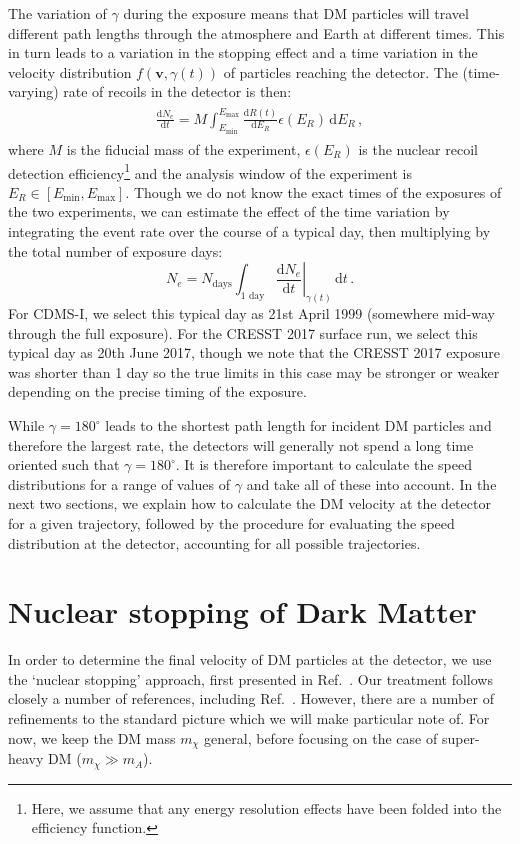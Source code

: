\documentclass[prd,twocolumn,showpacs,nofootinbib,aps]{revtex4-1}
\newcommand{\dbd}[2]{\frac{\mathrm{d}#1}{\mathrm{d}#2}}
\begin{document}
The variation of $\gamma$ during the exposure means that DM particles will travel different path lengths through the atmosphere and Earth at different times. This in turn leads to a variation in the stopping effect and a time variation in the velocity distribution $f(\mathbf{v}, \gamma(t))$ of particles reaching the detector. The (time-varying) rate of recoils in the detector is then:
\begin{align}
\begin{split}
\dbd{N_e}{t} = M \int_{E_\mathrm{min}}^{E_\mathrm{max}} \dbd{R(t)}{E_R} \epsilon(E_R) \,\mathrm{d}E_R\,,
\end{split}
\end{align}
where $M$ is the fiducial mass of the experiment, $\epsilon(E_R)$ is the nuclear recoil detection efficiency\footnote{Here, we assume that any energy resolution effects have been folded into the efficiency function.} and the analysis window of the experiment is $E_R \in [E_\mathrm{min}, E_\mathrm{max}]$. Though we do not know the exact times of the exposures of the two experiments, we can estimate the effect of the time variation by integrating the event rate over the course of a typical day, then multiplying by the total number of exposure days:
\begin{equation}
\label{eq:Nexp}
N_e = N_\mathrm{days} \int_{\mathrm{1\,\,day}} \left.\dbd{N_e}{t}\right|_{ \gamma(t)} \,\mathrm{d}t\,.
\end{equation}
For CDMS-I, we select this typical day as 21st April 1999 (somewhere mid-way through the full exposure). For the CRESST 2017 surface run, we select this typical day as 20th June 2017, though we note that the CRESST 2017 exposure was shorter than 1 day so the true limits in this case may be stronger or weaker depending on the precise timing of the exposure.

While $\gamma = 180^\circ$ leads to the shortest path length for incident DM particles and therefore the largest rate, the detectors will generally not spend a long time oriented such that $\gamma = 180^\circ$. It is therefore important to calculate the speed distributions for a range of values of $\gamma$ and take all of these into account. In the next two sections, we explain how to calculate the DM velocity at the detector for a given trajectory, followed by the procedure for evaluating the speed distribution at the detector, accounting for all possible trajectories.


\section{Nuclear stopping of Dark Matter}
\label{sec:NuclearStopping}
In order to determine the final velocity of DM particles at the detector, we use the `nuclear stopping' approach, first presented in Ref.~\cite{Starkman:1990nj}. Our treatment follows closely a number of references, including Ref.~\cite{Davis:2017noy}. However, there are a number of refinements to the standard picture which we will make particular note of. For now, we keep the DM mass $m_\chi$ general, before focusing on the case of super-heavy DM ($m_\chi \gg m_A$).
\end{document}
